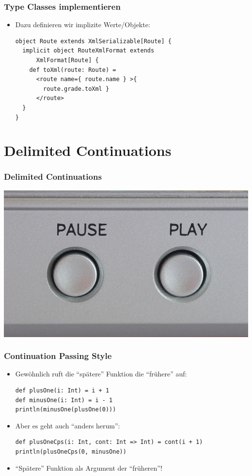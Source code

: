 \documentclass{beamer}
\begin{document}
\begin{frame}[fragile]
  \frametitle{Type Classes implementieren}
  \begin{itemize}
    \item Dazu definieren wir implizite Werte/Objekte:
    \begin{lstlisting}
object Route extends XmlSerializable[Route] {
  implicit object RouteXmlFormat extends
      XmlFormat[Route] {
    def toXml(route: Route) =
      <route name={ route.name } >{
        route.grade.toXml }
      </route>
  }
}
    \end{lstlisting}
  \end{itemize}
\end{frame}


\section{Delimited Continuations}

\begin{frame}
  \frametitle{Delimited Continuations}
  \includegraphics[width=\linewidth]{img/continue.jpg}
\end{frame}

\begin{frame}[fragile]
  \frametitle{Continuation Passing Style}
  \begin{itemize}
    \item Gew\"ohnlich ruft die "`sp\"atere"' Funktion die "`fr\"uhere"' auf:
    \begin{lstlisting}
def plusOne(i: Int) = i + 1
def minusOne(i: Int) = i - 1
println(minusOne(plusOne(0)))
    \end{lstlisting}
    \item Aber es geht auch "`anders herum"':
    \begin{lstlisting}
def plusOneCps(i: Int, cont: Int => Int) = cont(i + 1)
println(plusOneCps(0, minusOne))
    \end{lstlisting}
    \item "`Sp\"atere"' Funktion als Argument der "`fr\"uheren"'!
  \end{itemize}
\end{frame}
\end{document}
